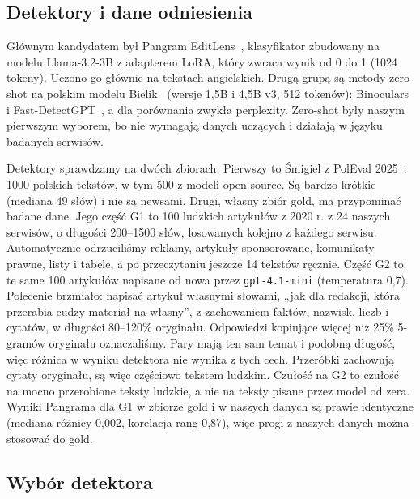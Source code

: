 \documentclass[11pt,a4paper]{article}
\begin{document}
\subsection{Detektory i dane odniesienia}

Głównym kandydatem był Pangram EditLens~\cite{editlens}, klasyfikator zbudowany na modelu Llama-3.2-3B z adapterem LoRA, który zwraca wynik od 0 do 1 (1024 tokeny). Uczono go głównie na tekstach angielskich. Drugą grupą są metody zero-shot na polskim modelu Bielik~\cite{bielik} (wersje 1,5B i 4,5B v3, 512 tokenów): Binoculars~\cite{binoculars} i Fast-DetectGPT~\cite{fastdetectgpt}, a dla porównania zwykła perplexity. Zero-shot były naszym pierwszym wyborem, bo nie wymagają danych uczących i działają w języku badanych serwisów.

Detektory sprawdzamy na dwóch zbiorach. Pierwszy to Śmigiel z PolEval 2025~\cite{smigiel}: 1000 polskich tekstów, w tym 500 z modeli open-source. Są bardzo krótkie (mediana 49 słów) i nie są newsami. Drugi, własny zbiór gold, ma przypominać badane dane. Jego część G1 to 100 ludzkich artykułów z 2020 r. z 24 naszych serwisów, o długości 200--1500 słów, losowanych kolejno z każdego serwisu. Automatycznie odrzuciliśmy reklamy, artykuły sponsorowane, komunikaty prawne, listy i tabele, a po przeczytaniu jeszcze 14 tekstów ręcznie. Część G2 to te same 100 artykułów napisane od nowa przez \texttt{gpt-4.1-mini} (temperatura 0,7). Polecenie brzmiało: napisać artykuł własnymi słowami, „jak dla redakcji, która przerabia cudzy materiał na własny”, z zachowaniem faktów, nazwisk, liczb i cytatów, w długości 80--120\% oryginału. Odpowiedzi kopiujące więcej niż 25\% 5-gramów oryginału oznaczaliśmy. Pary mają ten sam temat i podobną długość, więc różnica w wyniku detektora nie wynika z tych cech. Przeróbki zachowują cytaty oryginału, są więc częściowo tekstem ludzkim. Czułość na G2 to czułość na mocno przerobione teksty ludzkie, a nie na teksty pisane przez model od zera. Wyniki Pangrama dla G1 w zbiorze gold i w naszych danych są prawie identyczne (mediana różnicy 0,002, korelacja rang 0,87), więc progi z naszych danych można stosować do gold.

\subsection{Wybór detektora}
\end{document}
